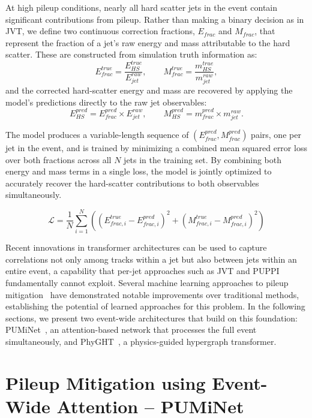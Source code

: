 At high pileup conditions, nearly all hard scatter jets in the event contain significant contributions from pileup. 
Rather than making a binary decision as in JVT, we define two continuous correction fractions, $E_{frac}$ and $M_{frac}$, that represent the fraction of a jet's raw energy and mass attributable to the hard scatter. 
These are constructed from simulation truth information as:
\begin{equation}
  E_{frac}^{true}=\frac{E_{HS}^{true}}{E_{jet}^{raw}}, \qquad M_{frac}^{true}=\frac{m_{HS}^{true}}{m_{jet}^{raw}},
\end{equation}
and the corrected hard-scatter energy and mass are recovered by applying the model's predictions directly to the raw jet observables:
\begin{equation}
  E_{HS}^{pred}=E_{frac}^{pred} \times E_{jet}^{raw}, \qquad M_{HS}^{pred}= m_{frac}^{pred} \times m_{jet}^{raw}.
\end{equation}

The model produces a variable-length sequence of $(E_{frac}^{pred}, M_{frac}^{pred})$ pairs, one per jet in the event, and is trained by minimizing a combined mean squared error loss over both fractions across all $N$ jets in the training set. 
By combining both energy and mass terms in a single loss, the model is jointly optimized to accurately recover the hard-scatter contributions to both observables simultaneously.

\begin{equation}
\mathcal{L} = \frac{1}{N} \sum_{i=1}^N \left ( \left( E_{frac,i}^{true} - E_{frac,i}^{pred} \right)^2 + \left( M_{frac,i}^{true} - M_{frac,i}^{pred} \right)^2 \right)
\end{equation}

Recent innovations in transformer architectures can be used to capture correlations not only among tracks within a jet but also between jets within an entire event, a capability that per-jet approaches such as JVT and PUPPI fundamentally cannot exploit.
Several machine learning approaches to pileup mitigation~\cite{PUMML,PUPPIML,PUMA} have demonstrated notable improvements over traditional methods, establishing the potential of learned approaches for this problem.
In the following sections, we present two event-wide architectures that build on this foundation: PUMiNet~\cite{puminet}, an attention-based network that processes the full event simultaneously, and PhyGHT~\cite{phyght}, a physics-guided hypergraph transformer.

\section{Pileup Mitigation using Event-Wide Attention -- PUMiNet}

